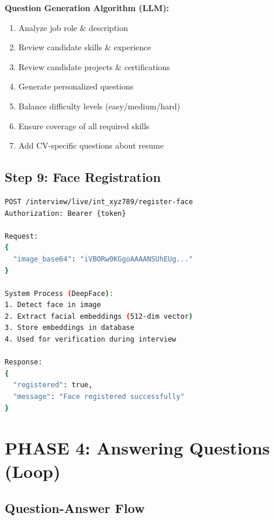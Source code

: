 \documentclass[12pt,a4paper]{article}
\begin{document}
\textbf{Question Generation Algorithm (LLM):}
\begin{enumerate}
    \item Analyze job role \& description
    \item Review candidate skills \& experience
    \item Review candidate projects \& certifications
    \item Generate personalized questions
    \item Balance difficulty levels (easy/medium/hard)
    \item Ensure coverage of all required skills
    \item Add CV-specific questions about resume
\end{enumerate}

\subsection{Step 9: Face Registration}

\begin{lstlisting}[language=bash, caption=Face Registration API]
POST /interview/live/int_xyz789/register-face
Authorization: Bearer {token}

Request:
{
  "image_base64": "iVBORw0KGgoAAAANSUhEUg..."
}

System Process (DeepFace):
1. Detect face in image
2. Extract facial embeddings (512-dim vector)
3. Store embeddings in database
4. Used for verification during interview

Response:
{
  "registered": true,
  "message": "Face registered successfully"
}
\end{lstlisting}

\newpage

\section{PHASE 4: Answering Questions (Loop)}

\subsection{Question-Answer Flow}
\end{document}
